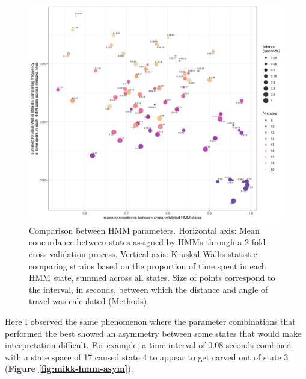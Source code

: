 \documentclass[
]{book}
\begin{document}
\begin{figure}
\includegraphics[width=1\linewidth]{figs/mikk_behaviour/compare_params} \caption{Comparison between HMM parameters. Horizontal axis: Mean concordance between states assigned by HMMs through a 2-fold cross-validation process. Vertical axis: Kruskal-Wallis statistic comparing strains based on the proportion of time spent in each HMM state, summed across all states. Size of points correspond to the interval, in seconds, between which the distance and angle of travel was calculated (Methods).}\label{fig:mikk-param-comp}
\end{figure}

Here I observed the same phenomenon where the parameter combinations that performed the best showed an asymmetry between some states that would make interpretation difficult. For example, a time interval of 0.08 seconds combined with a state space of 17 caused state 4 to appear to get carved out of state 3 (\textbf{Figure \ref{fig:mikk-hmm-asym}}).
\end{document}
